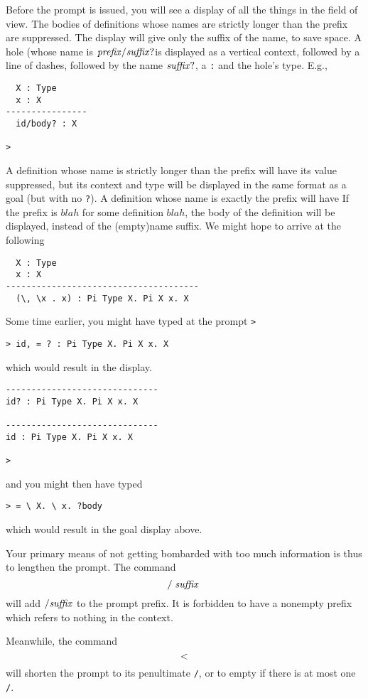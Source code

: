 \documentclass{article}
\begin{document}
Before the prompt is issued, you will see a display of all the things in the field of view. The bodies of definitions whose names are strictly longer than the prefix are suppressed.
The display will give only the suffix of the name, to save space.
A hole (whose name is $\mathit{prefix}{\tt /}\mathit{suffix}{\tt ?}$is
displayed as a vertical context, followed by a line of dashes, followed by
the name $\mathit{suffix}{\tt ?}$, a {\tt :} and the hole's type. E.g.,
\begin{verbatim}
  X : Type
  x : X
----------------
  id/body? : X

>
\end{verbatim}

A definition whose name is strictly longer than the prefix will have
its value suppressed, but its context and type will be displayed in
the same format as a goal (but with no {\tt ?}). A definition whose
name is exactly the prefix will have 
If the prefix is $\mathit{blah}$ for some definition $\mathit{blah}$, the body
of the definition will be displayed, instead of the (empty)name
suffix. We might hope to arrive at the following
\begin{verbatim}
  X : Type
  x : X
--------------------------------------
  (\, \x . x) : Pi Type X. Pi X x. X
\end{verbatim}


Some time earlier, you might have typed at the prompt {\tt >}
\begin{verbatim}
> id, = ? : Pi Type X. Pi X x. X
\end{verbatim}
which would result in the display.
\begin{verbatim}
------------------------------
id? : Pi Type X. Pi X x. X

------------------------------
id : Pi Type X. Pi X x. X

>
\end{verbatim}
and you might then have typed
\begin{verbatim}
> = \ X. \ x. ?body
\end{verbatim}
which would result in the goal display above.

Your primary means of not getting bombarded with too much information is thus
to lengthen the prompt. The command
\[
{\tt /}\;\mathit{suffix}\;
\]
will add ${\tt /}\mathit{suffix}$ to the prompt prefix. It is forbidden
to have a nonempty prefix which refers to nothing in the context.

Meanwhile, the command
\[
{\tt <}
\]
will shorten the prompt to its penultimate {\tt /}, or to empty if there is at most
one {\tt /}.
\end{document}

